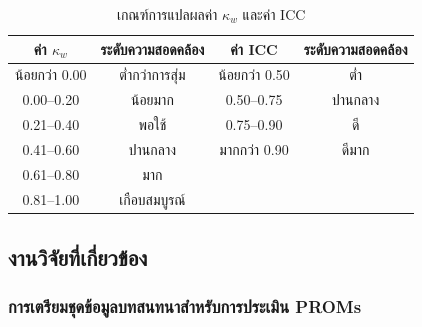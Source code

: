\begin{table}[htbp]
\centering
\setlength{\tabcolsep}{6pt}
\begin{tabular}{cc@{\hspace{2.5em}}cc}
\hline
\textbf{ค่า $\kappa_w$} & \textbf{ระดับความสอดคล้อง} & \textbf{ค่า ICC} & \textbf{ระดับความสอดคล้อง} \\
\hline
น้อยกว่า 0.00 & ต่ำกว่าการสุ่ม & น้อยกว่า 0.50 & ต่ำ \\
0.00--0.20 & น้อยมาก & 0.50--0.75 & ปานกลาง \\
0.21--0.40 & พอใช้ & 0.75--0.90 & ดี \\
0.41--0.60 & ปานกลาง & มากกว่า 0.90 & ดีมาก \\
0.61--0.80 & มาก & & \\
0.81--1.00 & เกือบสมบูรณ์ & & \\
\hline
\end{tabular}
\caption{เกณฑ์การแปลผลค่า $\kappa_w$ \citep{Landis1977} และค่า ICC \citep{Koo2016}}
\label{tab:agreement-interp}
\end{table}

\subsection{งานวิจัยที่เกี่ยวข้อง}

\subsubsection{การเตรียมชุดข้อมูลบทสนทนาสำหรับการประเมิน PROMs}
\label{sec:review-dataset}


